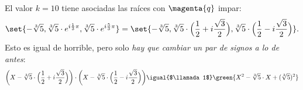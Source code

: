 El valor $k = 10$ tiene asociadas las raíces con $\magenta{q}$ impar:
$$
  \set{-\sqrt[3]{5}, \sqrt[3]{5} \cdot e^{i\frac{1}{3}\pi}, \sqrt[3]{5} \cdot e^{i\frac{5}{3}\pi} } =
  \set{-\sqrt[3]{5}, \sqrt[3]{5} \cdot \Big( \frac{1}{2} + i\frac{\sqrt{3}}{2} \Big), \sqrt[3]{5} \cdot \Big( \frac{1}{2} - i\frac{\sqrt{3}}{2} \Big) }.
$$
Esto es igual de horrible, pero solo \textit{hay que cambiar un par de signos a lo de antes}:
$$
  \bigg(X - \sqrt[3]{5} \cdot \Big( \frac{1}{2} + i\frac{\sqrt{3}}{2}\Big)\bigg)
  \cdot
  \bigg(X - \sqrt[3]{5} \cdot \Big( \frac{1}{2} - i\frac{\sqrt{3}}{2}\Big)\bigg)
  \igual{$\llamada1$}
  \green{X^2  - \sqrt[3]{5} \cdot X + (\sqrt[3]{5})^2}
$$

\begin{aportes}
  \item {}
\end{aportes}
